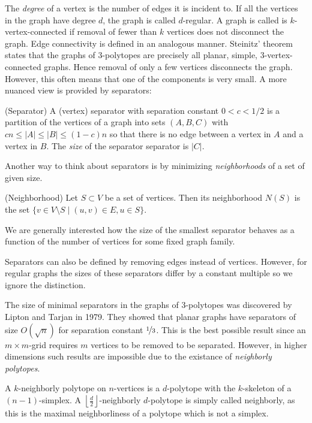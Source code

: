 The \textit{degree} of a vertex is the number of edges it is incident to. 
If all the vertices in the graph have degree $d$, the graph is called 
$d$-regular. A graph is called is $k$-vertex-connected if removal of fewer than 
$k$ vertices does not disconnect the graph. Edge connectivity is defined in an 
analogous manner. Steinitz' theorem states that the graphs of 
3-polytopes are precisely all planar, simple, 3-vertex-connected graphs. Hence 
removal of only a few vertices disconnects the graph. However, this
often means that one of the components is very small. A more nuanced view is 
provided 
by separators:

\begin{definition}
(Separator) A (vertex) separator with separation constant $0<c<1/2$ is a 
partition of the vertices of a graph into 
sets $(A,B,C)$  with $cn \le |A| \le |B| \le (1-c)n$ so that there is no edge between 
a vertex in $A$ and a vertex in $B$. The \textit{size} of the separator
separator is $|C|$.  
\end{definition}

Another way to think about separators is by minimizing \textit{neighborhoods} 
of a set of given size.

\begin{definition}
 (Neighborhood) Let $S \subset V$ be a set of vertices. Then its neighborhood 
$N(S)$ is the set $\{v \in V\setminus S \mid (u,v) \in E, u \in S\}$. 
\end{definition}

We are generally interested how the size of the smallest separator behaves as a 
function 
of the number of vertices for some fixed graph family.

Separators can also be defined by removing edges instead of vertices. However, 
for regular graphs the sizes of these separators differ by a constant multiple 
so we ignore the distinction.

The size of minimal separators in the graphs of 3-polytopes was discovered by 
Lipton and Tarjan \cite{LiTa} in 1979. They showed that planar graphs have 
separators of size $O(\sqrt{n})$ for separation constant $\nicefrac{1}{3}$. This is 
the best possible result since an $m\times m$-grid requires $m$ vertices to be 
removed to be separated. However, in higher dimensions such results are 
impossible due to the existance of \textit{neighborly polytopes}.

\begin{definition}
 A $k$-neighborly polytope on $n$-vertices is a $d$-polytope with the $k$-skeleton of a $(n-1)$-simplex.
A $\left\lfloor \frac{d}{2} \right\rfloor$-neighborly $d$-polytope is simply called neighborly, as this is the maximal
neighborliness of a polytope which is not a simplex.
\end{definition}

